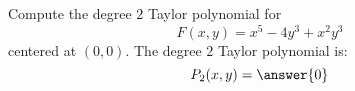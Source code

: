\documentclass{ximera}
\author{Bart Snapp}
\begin{document}
\begin{exercise}
  Compute the degree $2$ Taylor polynomial for
  \[
  F(x,y) = x^5-4y^3+x^2y^3
  \]
  centered at $(0,0)$.  The degree $2$ Taylor polynomial is:
  \[
  P_2(x,y) =\answer{0}
  \]
\end{exercise}
\end{document}
